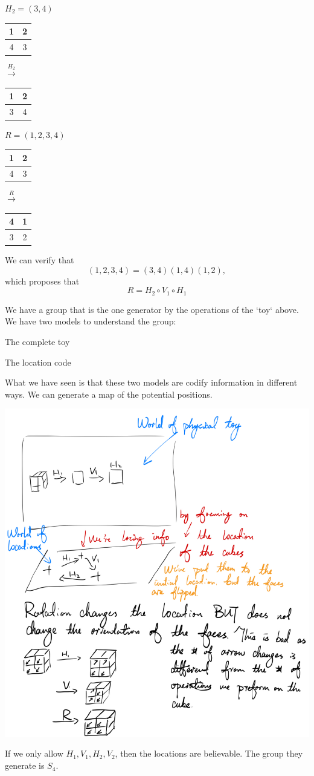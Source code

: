 \begin{example}
\begin{listu}
        \item $H_2 = (3, 4)$
        \begin{center} 
            \begin{tabular}{c|c} 1 & 2 \\ \hline 4 & 3 \end{tabular}
            \quad$\xrightarrow{H_2}$\quad
            \begin{tabular}{c|c} 1 & 2 \\ \hline 3 & 4 \end{tabular}
        \end{center}


        \item $R = (1, 2, 3, 4)$
        \begin{center} 
            \begin{tabular}{c|c} 1 & 2 \\ \hline 4 & 3 \end{tabular}
            \quad$\xrightarrow{R}$\quad
            \begin{tabular}{c|c} 4 & 1 \\ \hline 3 & 2 \end{tabular}
        \end{center}
    \end{listu}

    We can verify that \[
        (1, 2, 3, 4) = (3, 4)(1, 4)(1, 2),
    \] which proposes that \[
        R = H_2 \circ V_1 \circ H_1
    \]

\end{example}

We have a group that is the one generator by the operations of the `toy` above. We have two models to understand the group: \begin{listo}
    \item The complete toy 
    \item The location code
\end{listo} What we have seen is that these two models are codify information in different ways. We can generate a map of the potential positions. 


\begin{center}
    \includegraphics[width=0.55\linewidth]{figures/rubics-cube-1.png}
\end{center}

If we only allow $H_1, V_1, H_2, V_2$, then the locations are believable. The group they generate is $S_4$. 